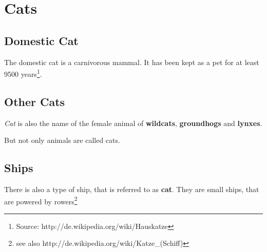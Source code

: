 \section{Cats}
\subsection{Domestic Cat}
The domestic cat is a carnivorous mammal. It has been kept as a pet for at least 9500 years\footnote{Source: http://de.wikipedia.org/wiki/Hauskatze}.
\subsection{Other Cats}
\textit{Cat} is also the name of the female animal of \textbf{wildcats}, \textbf{groundhogs} and \textbf{lynxes}.

But not only animals are called cats.
\subsection{Ships}
There is also a type of ship, that is referred to as \textbf{cat}. They are \tiny small \normalsize ships, that are powered by rowers\footnote{see also http://de.wikipedia.org/wiki/Katze\_(Schiff)}
